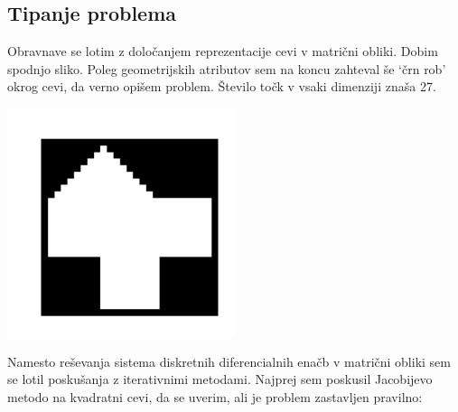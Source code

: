 \subsection{Tipanje problema}
Obravnave se lotim z določanjem reprezentacije cevi v matrični obliki. Dobim spodnjo sliko. Poleg geometrijskih atributov sem na koncu zahteval še `črn rob' okrog cevi, da verno opišem problem. Število točk v vsaki dimenziji znaša 27.
\begin{center}
    \includegraphics[width=0.5\textwidth]{../old/1-hiska.pdf}
\end{center}
Namesto reševanja sistema diskretnih diferencialnih enačb v matrični obliki sem se lotil poskušanja z iterativnimi metodami. Najprej sem poskusil Jacobijevo metodo na kvadratni cevi, da se uverim, ali je problem zastavljen pravilno:
